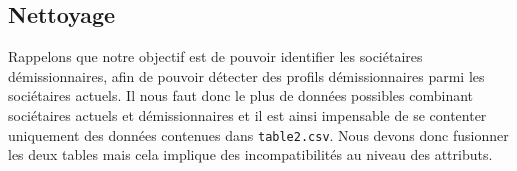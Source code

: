 \documentclass{ceri/sty/rapport}
\begin{document}
\subsection{Nettoyage}
\label{sec:Nettoyage}

Rappelons que notre objectif est de pouvoir identifier les sociétaires démissionnaires, afin de pouvoir détecter des profils démissionnaires parmi les sociétaires actuels. Il nous faut donc le plus de données possibles combinant sociétaires actuels et démissionnaires et il est ainsi impensable de se contenter uniquement des données contenues dans \texttt{table2.csv}. Nous devons donc fusionner les deux tables mais cela implique des incompatibilités au niveau des attributs.\\
\end{document}
